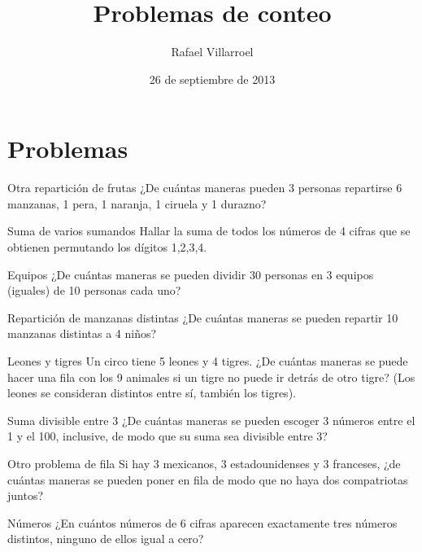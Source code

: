 \documentclass[spanish,presentation]{beamer}
\author{Rafael Villarroel}
\date{26 de septiembre de 2013}
\title{Problemas de conteo}
\begin{document}
\maketitle
{}

\section{Problemas}
\label{sec-1}

\begin{frame}[label=sec-1-1]{Otra repartición de frutas}
¿De cuántas maneras pueden 3 personas repartirse 6 manzanas, 1 pera, 1
naranja, 1 ciruela y 1 durazno?
\end{frame}
\begin{frame}[label=sec-1-2]{Suma de varios sumandos}
Hallar la suma de todos los números de 4 cifras que se obtienen
permutando los dígitos 1,2,3,4.
\end{frame}
\begin{frame}[label=sec-1-3]{Equipos}
¿De cuántas maneras se pueden dividir 30 personas en 3 equipos
(iguales) de 10 personas cada uno?
\end{frame}
\begin{frame}[label=sec-1-4]{Repartición de manzanas distintas}
¿De cuántas maneras se pueden repartir 10 manzanas \alert{distintas} a 4 niños?
\end{frame}
\begin{frame}[label=sec-1-5]{Leones y tigres}
Un circo tiene 5 leones y 4 tigres. ¿De cuántas maneras se puede hacer
una fila con los 9 animales si un tigre no puede ir detrás de otro
tigre? (Los leones se consideran distintos entre sí, también los tigres).
\end{frame}
\begin{frame}[label=sec-1-6]{Suma divisible entre 3}
¿De cuántas maneras se pueden escoger 3 números entre el 1 y el 100,
inclusive, de modo que su suma sea divisible entre 3?
\end{frame}
\begin{frame}[label=sec-1-7]{Otro problema de fila}
Si hay 3 mexicanos, 3 estadounidenses y 3 franceses, ¿de cuántas
maneras se pueden poner en fila de modo que no haya dos compatriotas
juntos? 
\end{frame}
\begin{frame}[label=sec-1-8]{Números}
¿En cuántos números de 6 cifras aparecen exactamente tres números
distintos,  ninguno de ellos igual a cero?
\end{frame}
\end{document}
